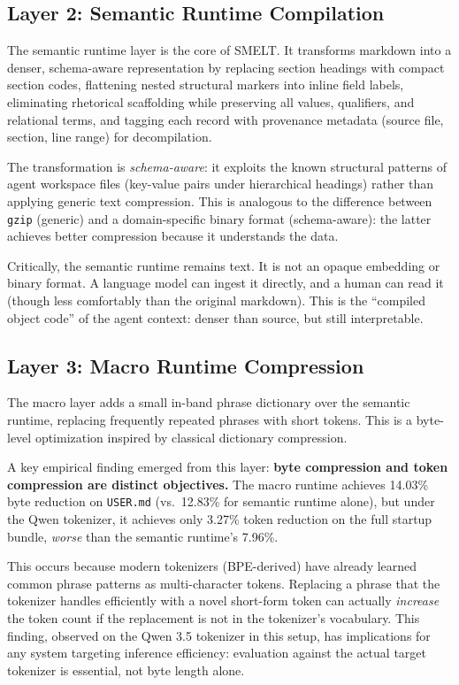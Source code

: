 \documentclass[11pt,a4paper]{article}
\begin{document}
\subsection{Layer 2: Semantic Runtime Compilation}

The semantic runtime layer is the core of SMELT. It transforms markdown into a denser, schema-aware representation by replacing section headings with compact section codes, flattening nested structural markers into inline field labels, eliminating rhetorical scaffolding while preserving all values, qualifiers, and relational terms, and tagging each record with provenance metadata (source file, section, line range) for decompilation.

The transformation is \textit{schema-aware}: it exploits the known structural patterns of agent workspace files (key-value pairs under hierarchical headings) rather than applying generic text compression. This is analogous to the difference between \texttt{gzip} (generic) and a domain-specific binary format (schema-aware): the latter achieves better compression because it understands the data.

Critically, the semantic runtime remains text. It is not an opaque embedding or binary format. A language model can ingest it directly, and a human can read it (though less comfortably than the original markdown). This is the ``compiled object code'' of the agent context: denser than source, but still interpretable.

\subsection{Layer 3: Macro Runtime Compression}

The macro layer adds a small in-band phrase dictionary over the semantic runtime, replacing frequently repeated phrases with short tokens. This is a byte-level optimization inspired by classical dictionary compression.

A key empirical finding emerged from this layer: \textbf{byte compression and token compression are distinct objectives.} The macro runtime achieves 14.03\% byte reduction on \texttt{USER.md} (vs.\ 12.83\% for semantic runtime alone), but under the Qwen tokenizer, it achieves only 3.27\% token reduction on the full startup bundle, \textit{worse} than the semantic runtime's 7.96\%.

This occurs because modern tokenizers (BPE-derived) have already learned common phrase patterns as multi-character tokens. Replacing a phrase that the tokenizer handles efficiently with a novel short-form token can actually \textit{increase} the token count if the replacement is not in the tokenizer's vocabulary. This finding, observed on the Qwen 3.5 tokenizer in this setup, has implications for any system targeting inference efficiency: evaluation against the actual target tokenizer is essential, not byte length alone.
\end{document}

